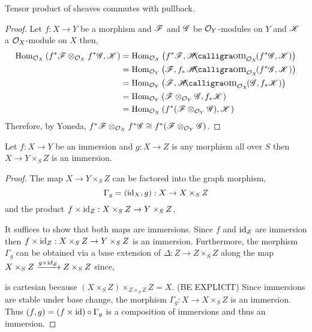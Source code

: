 \documentclass[12pt]{article}
\begin{document}
\begin{lemma}
Tensor product of sheaves commutes with pullback.
\end{lemma}

\begin{proof}
Let $f : X \to Y$ be a morphism and $\mathscr{F}$ and $\mathscr{G}$ be $\mathcal{O}_{Y}$-modules on $Y$ and $\mathscr{K}$ a $\mathcal{O}_{X}$-module on $X$ then,
\begin{align*}
\Hom{\struct{X}}{f^* \F \otimes_{\struct{X}} f^* \G}{\K} & = \Hom{\struct{X}}{f^* \F}{\shHom{\struct{X}}{f^* \G}{\K}}
\\
& = \Hom{\struct{Y}}{\F}{f_* \shHom{\struct{X}}{f^* \G}{\K}}
\\
& = \Hom{\struct{Y}}{\F}{\shHom{\struct{X}}{\G}{f_* \K}}
\\
& = \Hom{\struct{Y}}{\F \otimes_{\struct{Y}} \G}{f_* \K}
\\
& = \Hom{\struct{X}}{f^* (\F \otimes_{\struct{Y}} \G)}{\K}
\end{align*}
Therefore, by Yoneda, $f^* \mathscr{F} \otimes_{\mathcal{O}_{X}} f^* \mathscr{G} \cong f^* (\mathscr{F} \otimes_{\mathcal{O}_{Y}} \mathscr{G})$. 
\end{proof}

\begin{lemma}
Let $f : X \to Y$ be an immersion and $g : X \to Z$ is any morphism all over $S$ then $X \to Y \times_S Z$ is an immersion. 
\end{lemma}

\begin{proof}
The map $X \to Y \times_S Z$ can be factored into the graph morphism,
\[ \Gamma_g = (\mathrm{id}_X, g) : X \to X \times_S Z \]
and the product $f \times \mathrm{id}_Z : X \times_S Z \to Y \times_S Z$,
\begin{center}
\end{center}
It suffices to show that both maps are immersions. Since $f$ and $\mathrm{id}_Z$ are immersion then $f \times \mathrm{id}_Z : X \times_S Z \to Y \times_S Z$ is an immersion. Furthermore, the morphism $\Gamma_g$ can be obtained via a base extension of $\Delta : Z \to Z \times_S Z$ along the map $X \times_S Z \xrightarrow{g \times \mathrm{id}_Z} Z \times_S Z$ since,
\begin{center}
\end{center}
is cartesian because $(X \times_S Z) \times_{Z \times_S Z} Z = X$. (BE EXPLICIT) Since immersions are stable under base change, the morphism $\Gamma_g : X \to X \times_S Z$ is an immersion. Thus $(f, g) =  (f \times \mathrm{id}) \circ \Gamma_g$ is a composition of immersions and thus an immersion. 
\end{proof}
\end{document}

